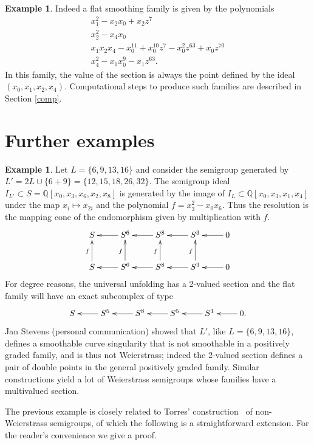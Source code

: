 \documentclass[twoside,12pt, leqno]{amsart}
\theoremstyle{definition}
\newtheorem{example}[theorem]{Example}
\def\QQ{{\mathbb Q}}
\begin{document}
\begin{example}
Indeed a flat smoothing family is given by
    the polynomials
   $$\!\begin{array}{l}
      x_{1}^{2}-x_{2}x_{0}+x_{2}z^{7}\\
      x_{2}^{2}-x_{4}x_{0}\\
      x_{1}x_{2}x_{4}-x_{0}^{11}+x_{0}^{10}z^{7}-x_{0}^{2}z^{63}+x_{0}z^{70}\\
      x_{4}^{2}-x_{1}x_{0}^{9}-x_{1}z^{63}.
      \end{array}$$
In this family, the value of the section is always the point defined by the ideal $(x_{0},x_{1},x_{2},x_{4})$.
Computational steps to produce such families are described in Section \ref{comp}.
 \medbreak
\end{example}

\section{Further examples}

\begin{example}\label{higher genus} 
Let $L=\{6,9,13,16\}$ and consider the semigroup generated by $L'=2L \cup \{6+9\}=\{12,15,18,26,32\}$. The semigroup ideal $I_{L'}\subset S=\QQ[x_{0},x_{3},x_{6},x_{2},x_{8}]$ is generated by the image of $I_{L} \subset \QQ[x_{0},x_{3},x_{1},x_{4}]$ under the map $x_{i} \mapsto x_{2i}$ and the polynomial $f=x_{3}^{2}-x_{0}x_{6}$. Thus the resolution is the mapping cone of the endomorphism given by multiplication with $f$.
$$
\xymatrix{ S & \ar[l] S^{6} & \ar[l] S^{8}& \ar[l] S^{3}& \ar[l] 0 \\
\ar[u]^{f} S & \ar[u]^{f} \ar[l] S^{6} & \ar[u]^{f} \ar[l] S^{8}& \ar[u]^{f} \ar[l] S^{3}& \ar[l] 0 \\}
$$
For degree reasons, the universal unfolding has a 2-valued section and  the flat family will have an exact subcomplex of type
$$
\xymatrix{ S & \ar[l] S^{5} & \ar[l] S^{8}& \ar[l] S^{5} &\ar[l] S^{1} & \ar[l] 0. \\
}
$$
Jan Stevens (personal communication) showed that $L'$, like $L =\{6,9,13,16\}$, defines a smoothable curve singularity that is not 
smoothable in a positively graded family, and is thus not Weierstrass; indeed the 2-valued section defines a pair of double points in the general positively graded family.  Similar constructions yield a lot of Weierstrass semigroups whose families have a multivalued section. 
\end{example}

The previous example is closely related to Torres' construction~\cite{Torres94} of non-Weierstrass semigroups, of which the following is a straightforward extension. For the reader's convenience we give a proof.  
\end{document}
